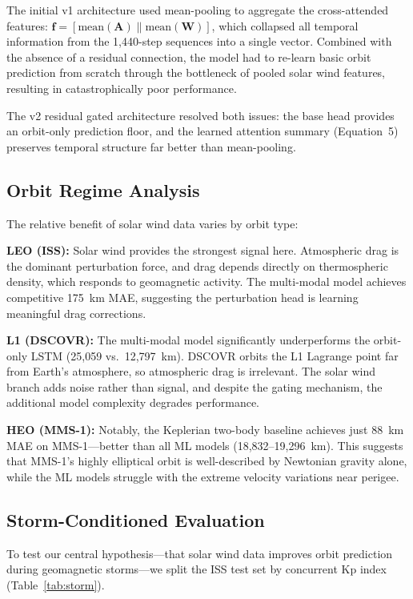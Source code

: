 \documentclass[twocolumn]{article}
\begin{document}
The initial v1 architecture used mean-pooling to aggregate the
cross-attended features:
$\mathbf{f} = [\text{mean}(\mathbf{A}) \| \text{mean}(\mathbf{W})]$,
which collapsed all temporal information from the 1,440-step sequences
into a single vector. Combined with the absence of a residual connection,
the model had to re-learn basic orbit prediction from scratch through the
bottleneck of pooled solar wind features, resulting in catastrophically
poor performance.

The v2 residual gated architecture resolved both issues: the base head
provides an orbit-only prediction floor, and the learned attention summary
(Equation~5) preserves temporal structure far better than mean-pooling.

\subsection{Orbit Regime Analysis}

The relative benefit of solar wind data varies by orbit type:

\textbf{LEO (ISS):} Solar wind provides the strongest signal here.
Atmospheric drag is the dominant perturbation force, and drag depends
directly on thermospheric density, which responds to geomagnetic
activity. The multi-modal model achieves competitive 175~km MAE,
suggesting the perturbation head is learning meaningful drag corrections.

\textbf{L1 (DSCOVR):} The multi-modal model significantly
underperforms the orbit-only LSTM (25,059 vs.\ 12,797~km). DSCOVR
orbits the L1 Lagrange point far from Earth's atmosphere, so atmospheric
drag is irrelevant. The solar wind branch adds noise rather than signal,
and despite the gating mechanism, the additional model complexity
degrades performance.

\textbf{HEO (MMS-1):} Notably, the Keplerian two-body baseline achieves
just 88~km MAE on MMS-1---better than all ML models (18,832--19,296~km).
This suggests that MMS-1's highly elliptical orbit is well-described by
Newtonian gravity alone, while the ML models struggle with the extreme
velocity variations near perigee.

\subsection{Storm-Conditioned Evaluation}
\label{sec:storm}

To test our central hypothesis---that solar wind data improves orbit
prediction during geomagnetic storms---we split the ISS test set by
concurrent Kp index (Table~\ref{tab:storm}).
\end{document}
